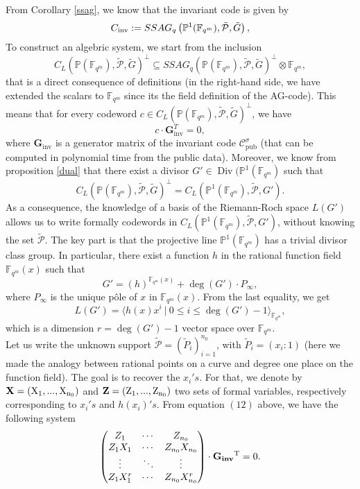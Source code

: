\documentclass[10pt]{article}
\newcommand{\cd}{\cdot}
\newcommand{\PP}{\mathbb{P}}
\newcommand{\fqm}{\mathbb{F}_{q^m}}
\newcommand{\su}{\subseteq}
\newcommand{\PR}{\mathcal{P}}
\newcommand{\Div}{\operatorname{Div}}
\begin{document}
From Corollary \ref{ssag}, we know that the invariant code is given by 
\[C_{\rm{inv}} := SSAG_q\left(\PP^1(\fqm),\tilde{\PR},\tilde{G}\right),\]
To construct an algebric system, we start from the inclusion 
\[C_L(\PP(\fqm),\tilde{\PR},\tilde{G})^{\perp} \su SSAG_q(\PP(\fqm),\tilde{\PR},\tilde{G})^{\perp} \otimes \fqm,\]
that is a direct consequence of definitions (in the right-hand side, we have extended the scalars to $\fqm$ since its the field definition of the AG-code). This means that for every codeword $c \in C_L(\PP(\fqm),\tilde{\PR},\tilde{G})^{\perp}$, we have 
\begin{equation}
c \cd \mathbf{G}_{\mathrm{inv}}^T = 0,
\end{equation}
where $\mathbf{G}_{\mathrm{inv}}$ is a generator matrix of the invariant code $\mathcal{C}_{\mathrm{pub}}^{\sigma}$ (that can be computed in polynomial time from the public data). Moreover, we know from proposition \ref{dual} that there exist a divisor $G' \in \Div(\PP^1(\fqm)$ such that
\[ C_L(\PP(\fqm),\tilde{\PR},\tilde{G})^{\perp} = C_L(\PP^1(\fqm),\tilde{\PR},G').\]
As a consequence, the knowledge of a basis of the Riemann-Roch space $L(G')$ allows us to write formally codewords in $C_L(\PP^1(\fqm),\tilde{\PR},G')$, without knowing the set $\tilde{\PR}$. The key part is that the projective line $\PP^1(\fqm)$ has a trivial divisor class group. In particular, there exist a function $h$ in the rational function field $\fqm(x)$ such that
\[ G' = (h)^{\fqm(x)} + \deg(G') \cd P_{\infty},\]
where $P_{\infty}$ is the unique pôle of $x$ in $\fqm(x)$. From the last equality, we get
\[L(G') = \langle h(x)x^i \ | \ 0 \leq i \leq \deg(G')-1\rangle_{\fqm},\]
which is a dimension $r=\deg(G')-1$ vector space over $\fqm$. \\
Let us write the unknown support $\tilde{\PR} = (\tilde{P}_i)_{i=1}^{n_0}$, with $\tilde{P}_i=(x_i:1)$ (here we made the analogy between rational points on a curve and degree one place on the function field). The goal is to recover the $x_i's$. For that, we denote by  
$\bf{X} \rm = (X_1,...,X_{n_0})$ and $\bf{Z} \rm = (Z_1,...,Z_{n_0})$ two sets of formal variables, respectively corresponding to $x_i's$ and $h(x_i)'s$. From equation $(12)$ above, we have the following system
\begin{equation*}
\begin{pmatrix}
Z_1 & \cdots & Z_{n_0} \\
Z_1X_1 & \cdots & Z_{n_0}X_{n_0} \\
\vdots & \ddots & \vdots \\
Z_1X_1^r & \cdots & Z_{n_0}X_{n_0}^r 
\end{pmatrix}
\cd \bf{G_{inv}} \rm{^T} = 0.
\end{equation*}
\end{document}
